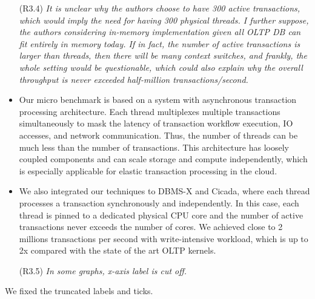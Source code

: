 \documentclass{article}
\newcommand{\changed}[1]{#1}
\newcommand{\changed}[1]{{\color{blue}#1}}
\begin{document}
\begin{itemize}
\item[(R3.4)] \emph{It is unclear why the authors choose to have 300 active transactions,
	which would imply the need for having 300 physical threads. I further
	suppose, the authors considering in-memory implementation given all OLTP
	DB can fit entirely in memory today. If in fact, the number of active
	transactions is larger than threads, then there will be many context switches,
	and frankly, the whole setting would be questionable, which could also
	explain why the overall throughput is never exceeded half-million
	transactions/second.}
\end{itemize}

\changed{
	\begin{itemize}
		\item Our micro benchmark is based on a system with asynchronous transaction processing architecture. Each thread multiplexes multiple transactions simultaneously to mask the latency of transaction workflow execution, IO accesses, and network communication. Thus, the number of threads can be much less than the number of transactions. This architecture has loosely coupled components and can scale storage and compute independently, which is especially applicable for elastic transaction processing in the cloud.
		\item We also integrated our techniques to DBMS-X and Cicada, where each thread processes a transaction synchronously and independently. In this case, each thread is pinned to a dedicated physical CPU core and the number of active transactions never exceeds the number of cores. We achieved close to 2 millions transactions per second with write-intensive workload, which is up to 2x compared with the state of the art OLTP kernels.  
		 
	\end{itemize}
}

\begin{itemize}
\item[(R3.5)] \emph{In some graphs, x-axis label is cut off.}
\end{itemize}

\changed{
	We fixed the truncated labels and ticks.
}
\end{document}
